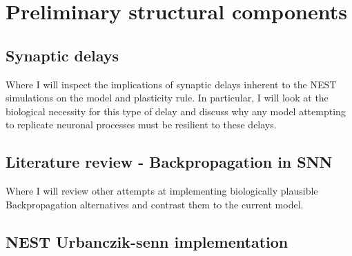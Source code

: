\documentclass[12pt,a4paper,titlepage]{report}
\begin{document}
\newpage

\chapter{Preliminary structural components}

\section{Synaptic delays}

Where I will inspect the implications of synaptic delays inherent to the NEST simulations on
the model and plasticity rule. In particular, I will look at the biological necessity for this
type of delay and discuss why any model attempting to replicate neuronal processes must be resilient
to these delays.


\section{Literature review - Backpropagation in SNN}

Where I will review other attempts at implementing biologically plausible Backpropagation
alternatives and contrast them to the current model.

\section{NEST Urbanczik-senn implementation}



\newpage

\end{document}
